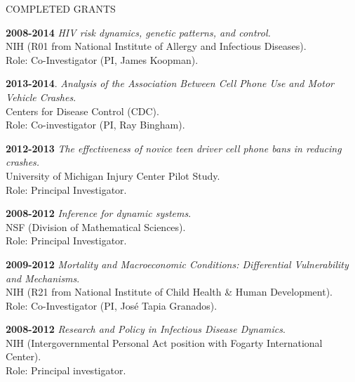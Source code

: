 \begin{mylist} {COMPLETED GRANTS}
\item{\bf 2008-2014 } {\em HIV risk dynamics, genetic patterns, and control.}\\
NIH (R01 from National Institute of Allergy and Infectious Diseases).\\
Role: Co-Investigator (PI, James Koopman).


\item {\bf 2013-2014}. {\em Analysis of the Association Between Cell Phone Use and Motor Vehicle Crashes}.\\
Centers for Disease Control (CDC).\\
Role: Co-investigator (PI, Ray Bingham).

\item {\bf 2012-2013 } {\em The effectiveness of novice teen driver cell phone bans in reducing crashes.}\\
University of Michigan Injury Center Pilot Study.\\
Role: Principal Investigator.

\item{\bf 2008-2012 } {\em Inference for dynamic systems}.\\
NSF (Division of Mathematical Sciences).\\
Role: Principal Investigator.

\item{\bf 2009-2012 } {\em Mortality and Macroeconomic Conditions: Differential Vulnerability and Mechanisms}.\\
NIH (R21 from National Institute of Child Health \& Human Development).\\
Role: Co-Investigator (PI, Jos\'{e} Tapia Granados). 

\item{\bf 2008-2012 } {\em Research and Policy in Infectious Disease Dynamics}.\\
NIH (Intergovernmental Personal Act position with Fogarty International Center).\\
Role: Principal investigator.


\end{mylist}
